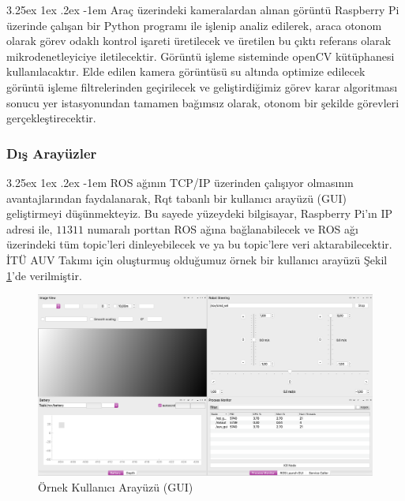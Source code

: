 \documentclass[12pt]{article}
\makeatletter
\newcounter{subsubsubsection}[subsubsection]
\renewcommand\paragraph{\@startsection{paragraph}{5}{\z@}%
  {3.25ex \@plus1ex \@minus.2ex}%
  {-1em}%
  {\normalfont\normalsize\bfseries}}
\makeatother
\begin{document}
\paragraph{} Araç üzerindeki kameralardan alınan görüntü Raspberry Pi üzerinde çalışan bir Python programı ile işlenip analiz edilerek, araca otonom olarak görev odaklı kontrol işareti üretilecek ve üretilen bu çıktı referans olarak mikrodenetleyiciye iletilecektir. Görüntü işleme sisteminde openCV kütüphanesi kullanılacaktır. Elde edilen kamera görüntüsü su altında optimize edilecek görüntü işleme filtrelerinden\cite{ARTICLE:image_proc} geçirilecek ve geliştirdiğimiz görev karar algoritması sonucu yer istasyonundan tamamen bağımsız olarak, otonom bir şekilde görevleri gerçekleştirecektir.


\subsubsection{Dış Arayüzler}
\paragraph{} ROS ağının TCP/IP üzerinden çalışıyor olmasının avantajlarından faydalanarak, Rqt tabanlı bir kullanıcı arayüzü (GUI) geliştirmeyi düşünmekteyiz. Bu sayede yüzeydeki bilgisayar, Raspberry Pi'ın IP adresi ile, $11311$ numaralı porttan ROS ağına bağlanabilecek ve ROS ağı üzerindeki tüm topic'leri dinleyebilecek ve ya bu topic'lere veri aktarabilecektir. İTÜ AUV Takımı için oluşturmuş olduğumuz örnek bir kullanıcı arayüzü Şekil \ref{fig:gui}'de verilmiştir.
\newpage
\begin{figure}
\centering
\includegraphics[width=1\textwidth]{images/gui.png}
\caption{Örnek Kullanıcı Arayüzü (GUI)}
\label{fig:gui}
\end{figure}
\end{document}
